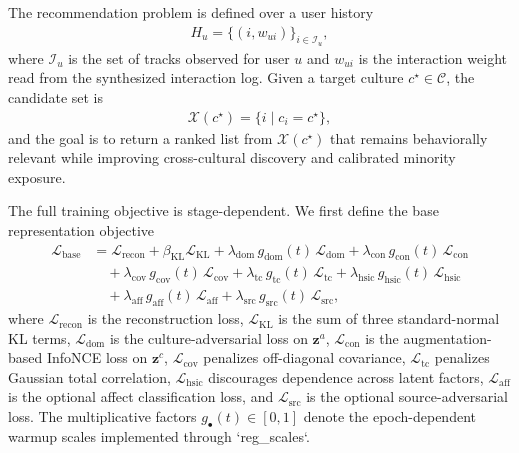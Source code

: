 The recommendation problem is defined over a user history
%
\begin{align}
H_u = \{(i, w_{ui})\}_{i \in \mathcal{I}_u},
\end{align}
%
where $\mathcal{I}_u$ is the set of tracks observed for user $u$ and $w_{ui}$ is the interaction weight read from the synthesized interaction log. Given a target culture $c^\star \in \mathcal{C}$, the candidate set is
\begin{align}
\mathcal{X}(c^\star) = \{ i \mid c_i = c^\star \},
\end{align}
and the goal is to return a ranked list from $\mathcal{X}(c^\star)$ that remains behaviorally relevant while improving cross-cultural discovery and calibrated minority exposure.

The full training objective is stage-dependent. We first define the base representation objective
%
\begin{align}
\mathcal{L}_{\mathrm{base}}
&=
\mathcal{L}_{\mathrm{recon}}
 + \beta_{\mathrm{KL}} \mathcal{L}_{\mathrm{KL}}
 + \lambda_{\mathrm{dom}}\, g_{\mathrm{dom}}(t)\, \mathcal{L}_{\mathrm{dom}}
 + \lambda_{\mathrm{con}}\, g_{\mathrm{con}}(t)\, \mathcal{L}_{\mathrm{con}} \nonumber\\
&\quad
 + \lambda_{\mathrm{cov}}\, g_{\mathrm{cov}}(t)\, \mathcal{L}_{\mathrm{cov}}
 + \lambda_{\mathrm{tc}}\, g_{\mathrm{tc}}(t)\, \mathcal{L}_{\mathrm{tc}}
 + \lambda_{\mathrm{hsic}}\, g_{\mathrm{hsic}}(t)\, \mathcal{L}_{\mathrm{hsic}} \nonumber\\
&\quad
 + \lambda_{\mathrm{aff}}\, g_{\mathrm{aff}}(t)\, \mathcal{L}_{\mathrm{aff}}
 + \lambda_{\mathrm{src}}\, g_{\mathrm{src}}(t)\, \mathcal{L}_{\mathrm{src}},
\end{align}
%
where $\mathcal{L}_{\mathrm{recon}}$ is the reconstruction loss, $\mathcal{L}_{\mathrm{KL}}$ is the sum of three standard-normal KL terms, $\mathcal{L}_{\mathrm{dom}}$ is the culture-adversarial loss on $\mathbf{z}^a$, $\mathcal{L}_{\mathrm{con}}$ is the augmentation-based InfoNCE loss on $\mathbf{z}^c$, $\mathcal{L}_{\mathrm{cov}}$ penalizes off-diagonal covariance, $\mathcal{L}_{\mathrm{tc}}$ penalizes Gaussian total correlation, $\mathcal{L}_{\mathrm{hsic}}$ discourages dependence across latent factors, $\mathcal{L}_{\mathrm{aff}}$ is the optional affect classification loss, and $\mathcal{L}_{\mathrm{src}}$ is the optional source-adversarial loss. The multiplicative factors $g_{\bullet}(t) \in [0,1]$ denote the epoch-dependent warmup scales implemented through `reg_scales`.

